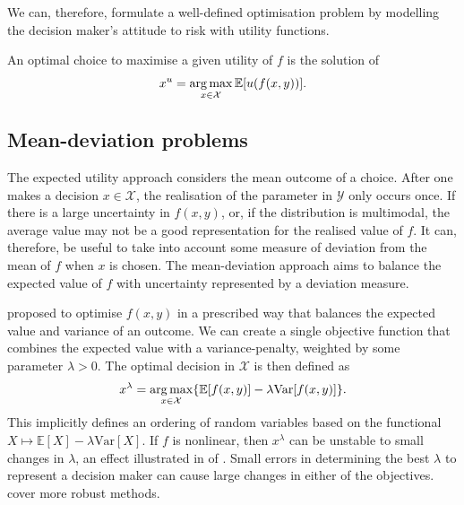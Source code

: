 \documentclass[main.tex]{subfiles}
\begin{document}
We can, therefore, formulate a well-defined optimisation problem by
modelling the decision maker's attitude to risk with utility functions.

\begin{problem}
  An optimal choice to maximise a given utility of $f$ is the
  solution of
  \begin{align}
    x^u=\operatorname*{arg\,max}_{x\in\mathcal{X}} \mathbb{E}[u(f(x,y))].
  \end{align}
\end{problem}

\subsection{Mean-deviation problems}
The expected utility approach considers the mean outcome of a choice.
After one makes a decision $x\in\mathcal{X}$, the realisation of the
parameter in $\mathcal{Y}$ only occurs once. If there is a large
uncertainty in $f(x,y)$, or, if the distribution is multimodal, the
average value may not be a good representation for the realised value of $f$.
It can, therefore, be useful to take into account some measure of
deviation from the mean of $f$ when $x$ is chosen.
The mean-deviation approach aims to balance the expected value of $f$
with uncertainty represented by a deviation measure.

\begin{example}
  \citet{markowitz1952portfolio} proposed to optimise $f(x,y)$ in
  a prescribed way that
  balances the expected value and variance of an outcome.
  We can create a single objective function that combines
  the expected value with a variance-penalty, weighted by some
  parameter $\lambda>0$. The optimal decision in $\mathcal{X}$ is then
  defined as
  \begin{equation}\label{eq:mean_dev_weighted}
    x^{\lambda}=\operatorname*{arg\,max}_{x\in\mathcal{X}}\{\mathbb{E}[f(x,y)]-\lambda
    \mbox{Var}[f(x,y)]\}.
  \end{equation}
  This implicitly defines an ordering of random variables based on
  the functional $X\mapsto \mathbb{E}[X]-\lambda \mbox{Var}[X]$.
  If $f$ is nonlinear, then $x^{\lambda}$ can be unstable to
  small changes in $\lambda$, an effect illustrated in
   of .
  Small errors in determining the best
  $\lambda$ to represent a decision maker can cause large changes in
  either of the objectives. \citet{marler2004survey} cover
  more robust methods.
\end{example}
\end{document}
